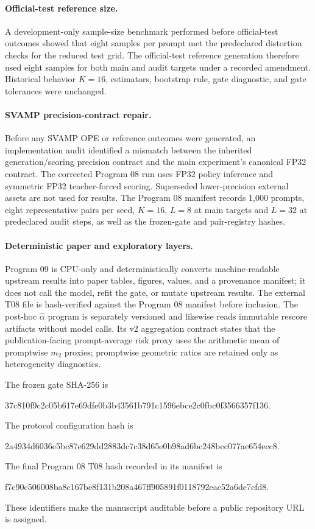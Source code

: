 \documentclass[10pt]{article}
\theoremstyle{remark}
\begin{document}
\paragraph{Official-test reference size.}
A development-only sample-size benchmark performed before official-test outcomes showed that eight samples per prompt met the predeclared distortion checks for the reduced test grid. The official-test reference generation therefore used eight samples for both main and audit targets under a recorded amendment. Historical behavior $K=16$, estimators, bootstrap rule, gate diagnostic, and gate tolerances were unchanged.

\paragraph{SVAMP precision-contract repair.}
Before any SVAMP OPE or reference outcomes were generated, an implementation audit identified a mismatch between the inherited generation/scoring precision contract and the main experiment's canonical FP32 contract. The corrected Program 08 run uses FP32 policy inference and symmetric FP32 teacher-forced scoring. Superseded lower-precision external assets are not used for results. The Program 08 manifest records 1,000 prompts, eight representative pairs per seed, $K=16$, $L=8$ at main targets and $L=32$ at predeclared audit steps, as well as the frozen-gate and pair-registry hashes.

\paragraph{Deterministic paper and exploratory layers.}
Program 09 is CPU-only and deterministically converts machine-readable upstream results into paper tables, figures, values, and a provenance manifest; it does not call the model, refit the gate, or mutate upstream results. The external T08 file is hash-verified against the Program 08 manifest before inclusion. The post-hoc $\widehat\alpha$ program is separately versioned and likewise reads immutable rescore artifacts without model calls. Its v2 aggregation contract states that the publication-facing prompt-average risk proxy uses the arithmetic mean of promptwise $m_2$ proxies; promptwise geometric ratios are retained only as heterogeneity diagnostics.

The frozen gate SHA-256 is
\begin{center}\ttfamily\small
37c810f9c2c05b617e69dfe0b3b43561b791c1596ebce2c0fbc0f3566357f136.
\end{center}
The protocol configuration hash is
\begin{center}\ttfamily\small
2a4934d6036e5bc87e629dd2883dc7c38d65e0b98ad6bc248bec077ae654ecc8.
\end{center}
The final Program 08 T08 hash recorded in its manifest is
\begin{center}\ttfamily\small
f7c90c506008ba8c167be8f131b208a467ff905891f0118792eac52a6de7cfd8.
\end{center}
These identifiers make the manuscript auditable before a public repository URL is assigned.
\end{document}
